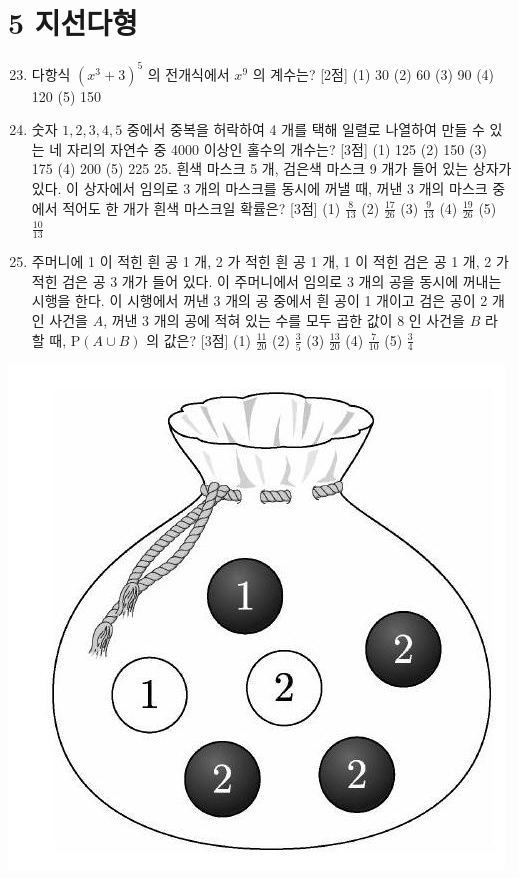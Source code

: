 \documentclass[10pt]{article}
\begin{document}
\section{5 지선다형}
\begin{enumerate}
  \setcounter{enumi}{22}
  \item 다항식 $\left(x^{3}+3\right)^{5}$ 의 전개식에서 $x^{9}$ 의 계수는? [2점]
(1) 30
(2) 60
(3) 90
(4) 120
(5) 150

  \item 숫자 $1,2,3,4,5$ 중에서 중복을 허락하여 4 개를 택해 일렬로 나열하여 만들 수 있는 네 자리의 자연수 중 4000 이상인 홀수의 개수는? [3점]
(1) 125
(2) 150
(3) 175
(4) 200
(5) 225 25. 흰색 마스크 5 개, 검은색 마스크 9 개가 들어 있는 상자가 있다. 이 상자에서 임의로 3 개의 마스크를 동시에 꺼낼 때, 꺼낸 3 개의 마스크 중에서 적어도 한 개가 흰색 마스크일 확률은? [3점]
(1) $\frac{8}{13}$
(2) $\frac{17}{26}$
(3) $\frac{9}{13}$
(4) $\frac{19}{26}$
(5) $\frac{10}{13}$

  \item 주머니에 1 이 적힌 흰 공 1 개, 2 가 적힌 흰 공 1 개, 1 이 적힌 검은 공 1 개, 2 가 적힌 검은 공 3 개가 들어 있다. 이 주머니에서 임의로 3 개의 공을 동시에 꺼내는 시행을 한다. 이 시행에서 꺼낸 3 개의 공 중에서 흰 공이 1 개이고 검은 공이 2 개인 사건을 $A$, 꺼낸 3 개의 공에 적혀 있는 수를 모두 곱한 값이 8 인 사건을 $B$ 라 할 때, $\mathrm{P}(A \cup B)$ 의 값은? [3점]
(1) $\frac{11}{20}$
(2) $\frac{3}{5}$
(3) $\frac{13}{20}$
(4) $\frac{7}{10}$
(5) $\frac{3}{4}$

\end{enumerate}

\begin{center}
\includegraphics[max width=\textwidth]{2023_06_06_b380aa8523ec7afae994g-30}
\end{center}
\end{document}
